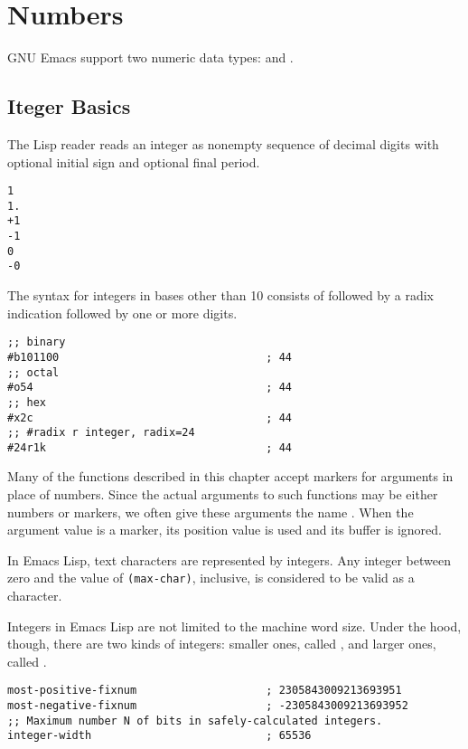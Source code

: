 
\chapter{Numbers}
\label{cha:numbers}

GNU Emacs support two numeric data types:  and .

\section{Iteger Basics}
\label{sec:iteger-basics}

The Lisp reader reads an integer as nonempty sequence of decimal digits with optional initial sign and optional final period.
\begin{lstlisting}
1
1.
+1
-1
0
-0
\end{lstlisting}

The syntax for integers in bases other than 10 consists of \argument{\#} followed by a radix indication followed by one or more digits.
\begin{lstlisting}
;; binary
#b101100                                ; 44
;; octal
#o54                                    ; 44
;; hex
#x2c                                    ; 44
;; #radix r integer, radix=24
#24r1k                                  ; 44
\end{lstlisting}

Many of the functions described in this chapter accept markers for arguments in place of numbers.
Since the actual arguments to such functions may be either numbers or markers, we often give these arguments the name .
When the argument value is a marker, its position value is used and its buffer is ignored.


In Emacs Lisp, text characters are represented by integers.
Any integer between zero and the value of \lstinline|(max-char)|, inclusive, is considered to be valid as a character.


Integers in Emacs Lisp are not limited to the machine word size.
Under the hood, though, there are two kinds of integers: smaller ones, called , and larger ones, called .

\begin{lstlisting}
most-positive-fixnum                    ; 2305843009213693951
most-negative-fixnum                    ; -2305843009213693952
;; Maximum number N of bits in safely-calculated integers.
integer-width                           ; 65536
\end{lstlisting}



